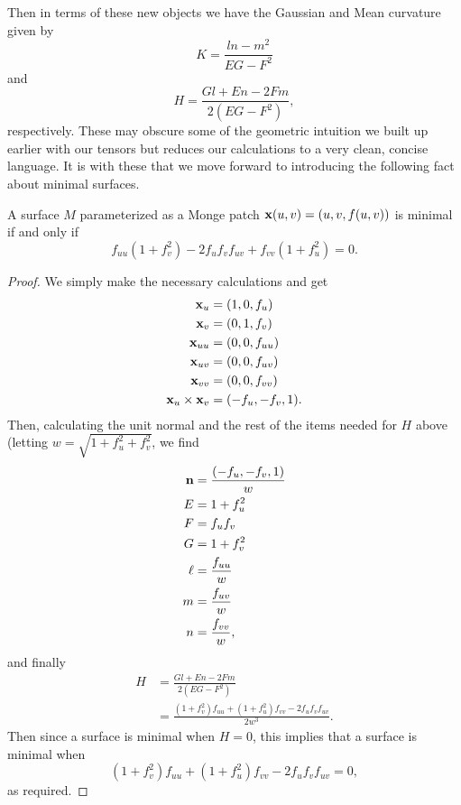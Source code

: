   Then in terms of these new objects we have the Gaussian and Mean curvature given by
  \begin{equation*}
    K = \frac{ln - m^2}{EG - F^2}
  \end{equation*}
  and
  \begin{equation}
    \label{eq:mean_curvature2}
    H = \frac{Gl + En - 2Fm}{2(EG - F^2)},
  \end{equation}
  respectively. These may obscure some of the geometric intuition we built up earlier with our tensors but reduces our calculations to a very clean, concise language. It is with these that we move forward to introducing the following fact about minimal surfaces.

  \begin{thm}
    \label{thm:minimal_surface_eq}
    A surface $M$ parameterized as a Monge patch $\mathbf{x}(u, v) = (u, v, f(u, v))$ is minimal if and only if
    \begin{equation*}
      f_{uu}\left(1 + f_v^2\right) - 2f_uf_vf_{uv} + f_{vv}\left(1 + f_u^2\right) = 0.
    \end{equation*}
  \end{thm}
  \begin{proof}
    We simply make the necessary calculations and get
    \begin{align*}
      \mathbf{x}_u &= (1, 0, f_u)\\
      \mathbf{x}_v &= (0, 1, f_v)\\
      \mathbf{x}_{uu} &= (0, 0, f_{uu})\\
      \mathbf{x}_{uv} &= (0, 0, f_{uv})\\
      \mathbf{x}_{vv} &= (0, 0, f_{vv})\\
      \mathbf{x}_u \times \mathbf{x}_v &= (-f_u, -f_v, 1).
    \end{align*}
    Then, calculating the unit normal and the rest of the items needed for $H$ above (letting $w = \sqrt{1 + f_u^2 + f_v^2}$, we find
    \begin{align*}
      \mathbf{n} &= \frac{(-f_u, -f_v, 1)}{w}\\
      E &= 1 + f_u^2\\
      F &= f_uf_v\\
      G &= 1 + f_v^2\\
      \ell &= \frac{f_{uu}}{w}\\
      m &= \frac{f_{uv}}{w}\\
      n &= \frac{f_{vv}}{w},
    \end{align*}
    and finally
    \begin{align*}
      H &= \frac{Gl + En - 2Fm}{2(EG - F^2)}\\
      &= \frac{(1 + f_v^2)f_{uu} + (1 + f_u^2)f_{vv} - 2f_uf_vf_{uv}}{2w^3}.
    \end{align*}
    Then since a surface is minimal when $H = 0$, this implies that a surface is minimal when 
    \[
      (1 + f_v^2)f_{uu} + (1 + f_u^2)f_{vv} - 2f_uf_vf_{uv} = 0,
    \]
    as required.
  \end{proof}
